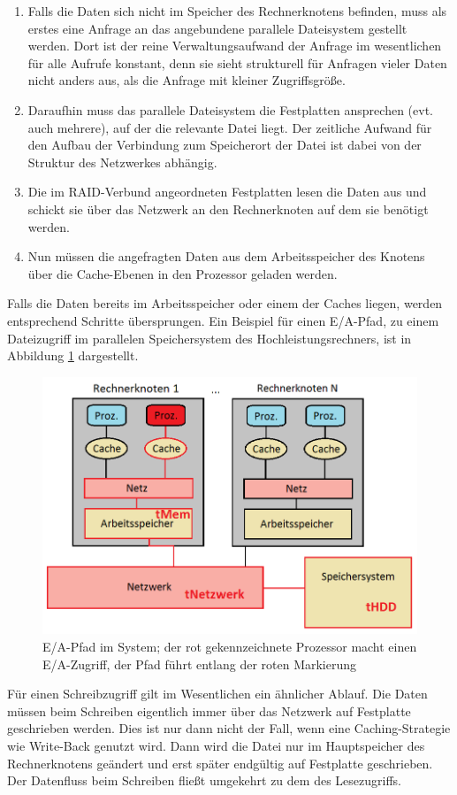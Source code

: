 \documentclass[
	twoside,
	12pt,
	a4paper,
	BCOR10mm,
	DIV14,
	listof=totoc,
	bibliography=totoc,
	headsepline
]{scrreprt}
\begin{document}
\begin{enumerate}
\item Falls die Daten sich nicht im Speicher des Rechnerknotens befinden, muss als erstes eine Anfrage an das angebundene parallele Dateisystem gestellt werden.
Dort ist der reine Verwaltungsaufwand der Anfrage im wesentlichen für alle Aufrufe konstant, denn sie sieht strukturell für Anfragen vieler Daten nicht anders aus, als die Anfrage mit kleiner Zugriffsgröße.
\item Daraufhin muss das parallele Dateisystem die Festplatten ansprechen (evt. auch mehrere), auf der die relevante Datei liegt. Der zeitliche Aufwand für den Aufbau der Verbindung zum Speicherort der Datei ist dabei von der Struktur des Netzwerkes abhängig.
\item Die im RAID-Verbund angeordneten Festplatten lesen die Daten aus und schickt sie über das Netzwerk an den Rechnerknoten auf dem sie benötigt werden.
\item Nun müssen die angefragten Daten aus dem Arbeitsspeicher des Knotens über die Cache-Ebenen in den Prozessor geladen werden. 
\end{enumerate}
Falls die Daten bereits im Arbeitsspeicher oder einem der Caches liegen, werden entsprechend Schritte übersprungen. Ein Beispiel für einen E/A-Pfad, zu einem Dateizugriff im parallelen Speichersystem des Hochleistungsrechners, ist in Abbildung \ref{fig:ea_pfad} dargestellt.\medskip

\begin{figure}[h]
	\begin{center}
		\includegraphics[width=.43\textwidth]{Bilder/rechnerknoten_ea_pfad.png}
	\end{center}
	\caption{E/A-Pfad im System; der rot gekennzeichnete Prozessor macht einen E/A-Zugriff, der Pfad führt entlang der roten Markierung}
	\label{fig:ea_pfad}
\end{figure}

Für einen Schreibzugriff gilt im Wesentlichen ein ähnlicher Ablauf.
Die Daten müssen beim Schreiben eigentlich immer über das Netzwerk auf Festplatte geschrieben werden. Dies ist nur dann nicht der Fall, wenn eine Caching-Strategie wie Write-Back genutzt wird. Dann wird die Datei nur im Hauptspeicher des Rechnerknotens geändert und erst später endgültig auf Festplatte geschrieben.
Der Datenfluss beim Schreiben fließt umgekehrt zu dem des Lesezugriffs.
\end{document}

